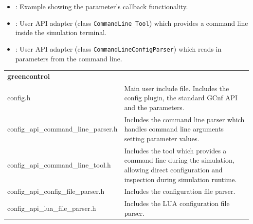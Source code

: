 \begin{itemize}
  \item {}:  \newline
  	Example showing the parameter's callback functionality.

  \item {}:  \newline
  	User API adapter (class \lstinline|CommandLine_Tool|) which provides a command line inside the simulation terminal.

  \item {}:  \newline
  	User API adapter (class \lstinline|CommandLineConfigParser|) which reads in parameters from the command line.
\end{itemize}


\noindent
\begin{minipage}{\textwidth}
\begin{tabularx}{\textwidth}{|l|X|}
	\cline{1-1}\cline{2-2}\multicolumn{2}{|l|}{  {\bf greencontrol}    }\\
	\cline{1-1}\cline{2-2}  config.h &   Main user include file. Includes the config plugin, the standard GCnf API and the parameters.   \\
	\hline
	\cline{1-1}\cline{2-2}  config\_api\_command\_line\_parser.h &   Includes the command line parser which handles command line arguments setting parameter values.  \\
	\hline
	\cline{1-1}\cline{2-2}  config\_api\_command\_line\_tool.h &   Includes the tool which provides a command line during the simulation, allowing direct configuration and inspection during simulation runtime.  \\
	\hline
	\cline{1-1}\cline{2-2}  config\_api\_config\_file\_parser.h &   Includes the configuration file parser. \\
	\hline
	\cline{1-1}\cline{2-2}  config\_api\_lua\_file\_parser.h &   Includes the LUA configuration file parser. \\
	\hline
\end{tabularx}
\end{minipage}

\vspace{1 cm}

